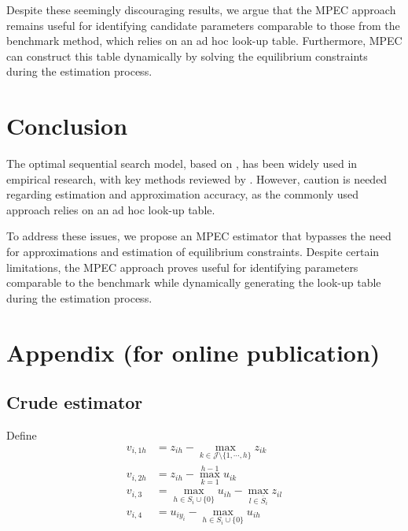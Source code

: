\documentclass[12pt]{article}
\begin{document}
Despite these seemingly discouraging results, we argue that the MPEC approach remains useful for identifying candidate parameters comparable to those from the benchmark method, which relies on an ad hoc look-up table. Furthermore, MPEC can construct this table dynamically by solving the equilibrium constraints during the estimation process.

\section{Conclusion}

The optimal sequential search model, based on \cite{weitzman1979optimal}, has been widely used in empirical research, with key methods reviewed by \cite{ursu2023sequential}. However, caution is needed regarding estimation and approximation accuracy, as the commonly used approach relies on an ad hoc look-up table.

To address these issues, we propose an MPEC estimator that bypasses the need for approximations and estimation of equilibrium constraints. Despite certain limitations, the MPEC approach proves useful for identifying parameters comparable to the benchmark while dynamically generating the look-up table during the estimation process.





\newpage
\appendix
\section{Appendix (for online publication)}

\subsection{Crude estimator}

Define
\begin{align}
    v_{i,1h} &= z_{ih} - \max_{k \in \mathcal{J}\setminus \{1,\cdots,h\}} z_{ik} \label{v1}\\
    v_{i,2h} &=  z_{ih} - \max_{k = 1}^{h-1} u_{ik} \label{v2} \\
    v_{i,3} &= \max_{h \in S_i \cup \{0\}} u_{ih} - \max_{l \in \bar{S}_i} z_{il} \label{v3}\\
    v_{i,4} &= u_{iy_i} - \max_{h \in S_i \cup \{0\}} u_{ih}  \label{v4}
\end{align}
\end{document}
